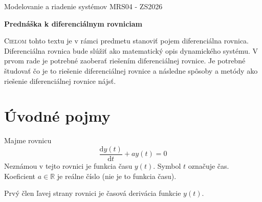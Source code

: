 \documentclass[a4paper, 10pt, ]{article}
\def\oznacenieCasti{MRS04 - ZS2026}
\begin{document}
\lstset{%
style=mystyle,
rangebeginprefix=\#\#\#\ cellB\ ,%
rangebeginsuffix=\ \#\#\#,%
rangeendprefix=\#\#\#\ cellE\ ,%
rangeendsuffix=\ \#\#\#,%
includerangemarker=false,
}





\fontsize{12pt}{22pt}\selectfont

\centerline{\textsf{Modelovanie a riadenie systémov} \hfill \textsf{\oznacenieCasti}}

\fontsize{18pt}{22pt}\selectfont





\begin{flushleft}
	\textbf{\textsf{Prednáška k diferenciálnym rovniciam}}
\end{flushleft}





\normalsize

\bigskip

{\hypersetup{hidelinks}

\tableofcontents

}

\bigskip

\vspace{18pt}



\noindent
\lettrine[lines=3, nindent=0pt]{C}{ieľom} tohto textu je v rámci predmetu stanoviť pojem diferenciálna rovnica. Diferenciálna rovnica bude slúžiť ako matematický opis dynamického systému. V prvom rade je potrebné zaoberať riešením diferenciálnej rovnice. Je potrebné študovať čo je to riešenie diferenciálnej rovnice a následne spôsoby a metódy ako riešenie diferenciálnej rovnice nájsť.





\section{Úvodné pojmy}

Majme rovnicu
\begin{equation} \label{eq:1}
    \frac{\text{d}y(t)}{\text{d}t} + a y(t) = 0
\end{equation}
Neznámou v tejto rovnici je funkcia času $y(t)$. Symbol $t$ označuje čas. Koeficient $a \in \mathbb R$ je reálne číslo (nie je to funkcia času). 

Prvý člen ľavej strany rovnici je časová derivácia funkcie $y(t)$. 
\end{document}
